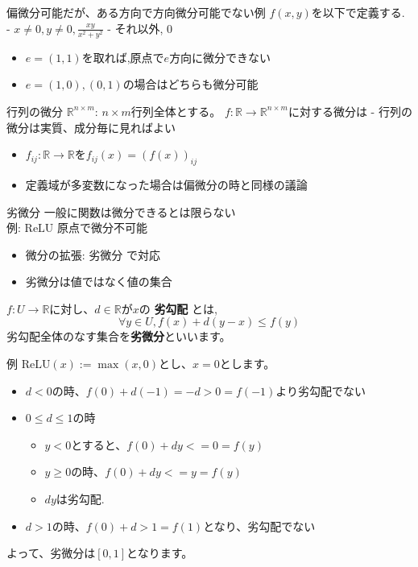 \begin{frame}{偏微分可能だが、ある方向で方向微分可能でない例}
$f(x, y)$を以下で定義する.
  - $x \neq 0, y \neq 0,\frac{xy}{x^2 + y^2}$
  - それ以外, 0
\begin{itemize}
\item $e = (1, 1)$を取れば,原点で$e$方向に微分できない
\item $e = (1, 0), (0, 1)$の場合はどちらも微分可能
\end{itemize}
\end{frame}

\begin{frame}{行列の微分}
$\mathbb{R}^{n \times m}$: $n \times m$行列全体とする。
$f: \mathbb{R} \to \mathbb{R}^{n \times m}$に対する微分は
- 行列の微分は実質、成分毎に見ればよい
\begin{itemize}
  \item $f_{ij}: \mathbb{R} \to \mathbb{R}$を$f_{ij}(x) = (f(x))_{ij}$
  \item 定義域が多変数になった場合は偏微分の時と同様の議論
\end{itemize}
\end{frame}

\begin{frame}{劣微分}
一般に関数は微分できるとは限らない \\
例: $\mathrm{ReLU}$ 原点で微分不可能
\begin{itemize}
\item  微分の拡張: 劣微分 で対応
\item 劣微分は値ではなく値の集合
\end{itemize}
\begin{screen}
$f: U \to \mathbb{R}$に対し、$d \in \mathbb{R}$が$x$の \textbf{劣勾配} とは,
\begin{equation*}
  \forall y \in U, f(x) + d(y-x) \le f(y)
\end{equation*}
劣勾配全体のなす集合を\textbf{劣微分}といいます。
\end{screen}

\end{frame}


\begin{frame}{例}
$\mathrm{ReLU}(x):= \max(x, 0)$とし、$x=0$とします。
\begin{itemize}
\item $d < 0$の時、$f(0) + d(-1) =  -d > 0 = f(-1)$より劣勾配でない
\item $0 \le d \le 1$の時
   \begin{itemize}
  \item $y<0$とすると、$f(0) + dy <= 0 = f(y)$
  \item $y \ge 0$の時、$f(0) + dy <= y = f(y)$
  \item $dy$は劣勾配.
   \end{itemize}
\item $d > 1$の時、$f(0) + d > 1 = f(1)$となり、劣勾配でない
\end{itemize}
よって、劣微分は$[0, 1]$となります。
\end{frame}


